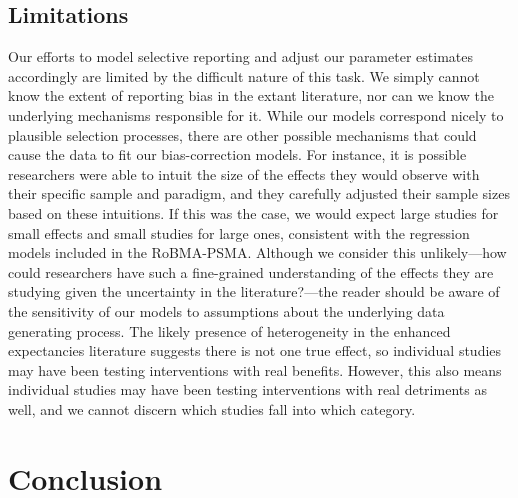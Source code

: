\documentclass[
  doc, donotrepeattitle,floatsintext]{apa7}
\begin{document}
\hypertarget{limitations}{%
\subsection{Limitations}\label{limitations}}

Our efforts to model selective reporting and adjust our parameter estimates accordingly are limited by the difficult nature of this task. We simply cannot know the extent of reporting bias in the extant literature, nor can we know the underlying mechanisms responsible for it. While our models correspond nicely to plausible selection processes, there are other possible mechanisms that could cause the data to fit our bias-correction models. For instance, it is possible researchers were able to intuit the size of the effects they would observe with their specific sample and paradigm, and they carefully adjusted their sample sizes based on these intuitions. If this was the case, we would expect large studies for small effects and small studies for large ones, consistent with the regression models included in the RoBMA-PSMA. Although we consider this unlikely---how could researchers have such a fine-grained understanding of the effects they are studying given the uncertainty in the literature?---the reader should be aware of the sensitivity of our models to assumptions about the underlying data generating process. The likely presence of heterogeneity in the enhanced expectancies literature suggests there is not one true effect, so individual studies may have been testing interventions with real benefits. However, this also means individual studies may have been testing interventions with real detriments as well, and we cannot discern which studies fall into which category.

\hypertarget{conclusion}{%
\section{Conclusion}\label{conclusion}}
\end{document}
